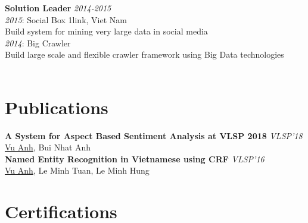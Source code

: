 \documentclass[11pt,a4paper,roman]{article}
\begin{document}
\noindent\textbf{Solution Leader}
\hfill
\textit{2014-2015} \\
\textit{2015}: Social Box
\hfill
1link, Viet Nam
\\
Build system for mining very large data in social media
\\
\textit{2014}: Big Crawler\\
Build large scale and flexible crawler framework using Big Data technologies
\\
\\


\section{Publications}

\textbf{A System for Aspect Based Sentiment Analysis at VLSP 2018}
\hfill
\textit{VLSP'18} \\
\underline{Vu Anh}, Bui Nhat Anh
\\

\noindent
\textbf{Named Entity Recognition in Vietnamese using CRF}
\hfill
\textit{VLSP'16} \\
\underline{Vu Anh}, Le Minh Tuan, Le Minh Hung

\section{Certifications}
\end{document}
